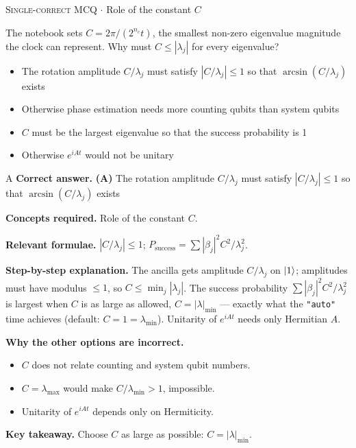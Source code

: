 \documentclass[11pt,a4paper]{article}
\newcommand{\optlabel}[1]{\textbf{(#1)}}
\newcommand{\correctlabel}[1]{\textcolor{okgreen}{\textbf{(#1)}\,\ding{51}}}
\newenvironment{qitem}[1]{\begin{list}{}{\setlength{\leftmargin}{3.3em}\setlength{\labelwidth}{3.1em}%
  \setlength{\labelsep}{0.2em}\setlength{\topsep}{3pt}\setlength{\parsep}{3pt}}\item[\textbf{Q.#1}\hfill]}{\end{list}}
\newcommand{\qsep}{\par\vspace{2pt}{\color{black!15}\hrule}\vspace{4pt}}
\newcommand{\qmeta}[2]{{\footnotesize\color{black!60}\textsc{#1} \;$\cdot$\; #2}\par}
\begin{document}
\begin{qitem}{43}
\qmeta{Single-correct MCQ}{Role of the constant $C$}
The notebook sets $C = 2\pi/(2^{n_c}t)$, the smallest non-zero eigenvalue magnitude the clock can represent. Why must $C \le |\lambda_j|$ for every eigenvalue?
\begin{itemize}[leftmargin=2.6em, labelsep=0.4em, itemsep=2pt, topsep=3pt]
\item[\correctlabel{A}] The rotation amplitude $C/\lambda_j$ must satisfy $|C/\lambda_j| \le 1$ so that $\arcsin(C/\lambda_j)$ exists
\item[\optlabel{B}] Otherwise phase estimation needs more counting qubits than system qubits
\item[\optlabel{C}] $C$ must be the largest eigenvalue so that the success probability is 1
\item[\optlabel{D}] Otherwise $e^{iAt}$ would not be unitary
\end{itemize}
\end{qitem}
\begin{solbox}{A}
\textbf{\color{brand}Correct answer.} \textcolor{okgreen}{\textbf{(A)}} The rotation amplitude $C/\lambda_j$ must satisfy $|C/\lambda_j| \le 1$ so that $\arcsin(C/\lambda_j)$ exists

\textbf{\color{brand}Concepts required.} Role of the constant $C$.

\textbf{\color{brand}Relevant formulae.} $|C/\lambda_j| \le 1$; $P_{\text{success}} = \sum|\beta_j|^2C^2/\lambda_j^2$.

\textbf{\color{brand}Step-by-step explanation.} The ancilla gets amplitude $C/\lambda_j$ on $\ket1$; amplitudes must have modulus $\le 1$, so $C \le \min_j|\lambda_j|$. The success probability $\sum|\beta_j|^2C^2/\lambda_j^2$ is largest when $C$ is
as large as allowed, $C = |\lambda|_{\min}$ --- exactly what the \texttt{"auto"} time achieves (default: $C = 1 = \lambda_{\min}$). Unitarity of $e^{iAt}$ needs only Hermitian $A$.

\textbf{\color{brand}Why the other options are incorrect.}
\begin{itemize}[leftmargin=2.4em, itemsep=1pt, topsep=2pt]
\item[\textbf{(B)}] $C$ does not relate counting and system qubit numbers.
\item[\textbf{(C)}] $C = \lambda_{\max}$ would make $C/\lambda_{\min} > 1$, impossible.
\item[\textbf{(D)}] Unitarity of $e^{iAt}$ depends only on Hermiticity.
\end{itemize}
\textbf{\color{brand}Key takeaway.} Choose $C$ as large as possible: $C = |\lambda|_{\min}$.
\end{solbox}
\qsep
\end{document}
